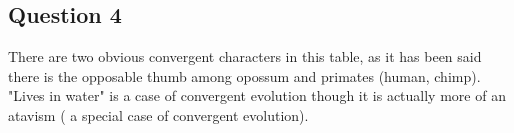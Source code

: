 \documentclass[]{article}
\theoremstyle{definition}
\begin{document}
\subsection{Question 4}
There are two obvious convergent characters in this table, as it has been said there is the opposable thumb among opossum and primates (human, chimp).\\
"Lives in water" is a case of convergent evolution though it is actually more of an atavism ( a special case of convergent evolution).\\
\end{document}
